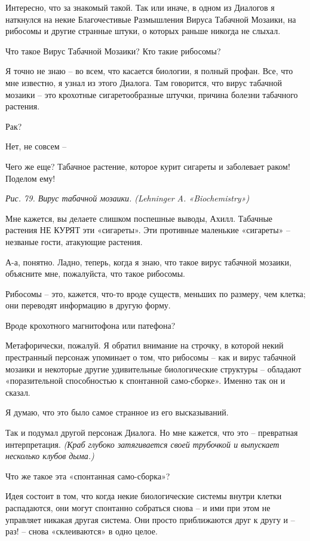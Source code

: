 \documentclass[../main.tex]{subfiles}
\begin{document}
\begin{dialogue}
 Интересно, что за знакомый такой. Так или иначе, в одном из Диалогов я наткнулся на некие Благочестивые Размышления Вируса Табачной Мозаики, на рибосомы и другие странные штуки, о которых раньше никогда не слыхал.

 Что такое Вирус Табачной Мозаики? Кто такие рибосомы?

 Я точно не знаю \--- во всем, что касается биологии, я полный профан. Все, что мне известно, я узнал из этого Диалога. Там говорится, что вирус табачной мозаики \--- это крохотные сигаретообразные штучки, причина болезни табачного растения.

 Рак?

 Нет, не совсем \---

 Чего же еще? Табачное растение, которое курит сигареты и заболевает раком! Поделом ему!

\emph{Рис. 79. Вирус табачной мозаики. (Lehninger A. «Biochemistry»)}

 Мне кажется, вы делаете слишком поспешные выводы, Ахилл. Табачные растения НЕ КУРЯТ эти «сигареты». Эти противные маленькие «сигареты» \--- незваные гости, атакующие растения.

 А-а, понятно. Ладно, теперь, когда я знаю, что такое вирус табачной мозаики, объясните мне, пожалуйста, что такое рибосомы.

 Рибосомы \--- это, кажется, что-то вроде существ, меньших по размеру, чем клетка; они переводят информацию в другую форму.

 Вроде крохотного магнитофона или патефона?

 Метафорически, пожалуй. Я обратил внимание на строчку, в которой некий престранный персонаж упоминает о том, что рибосомы \--- как и вирус табачной мозаики и некоторые другие удивительные биологические структуры \--- обладают «поразительной способностью к спонтанной само-сборке». Именно так он и сказал.

 Я думаю, что это было самое странное из его высказываний.

 Так и подумал другой персонаж Диалога. Но мне кажется, что это \--- превратная интерпретация. \emph{(Краб глубоко затягивается своей трубочкой и выпускает несколько клубов дыма.)}

 Что же такое эта «спонтанная само-сборка»?

 Идея состоит в том, что когда некие биологические системы внутри клетки распадаются, они могут спонтанно собраться снова \--- и ими при этом не управляет никакая другая система. Они просто приближаются друг к другу и \--- раз! \--- снова «склеиваются» в одно целое.


\end{dialogue}
\end{document}
